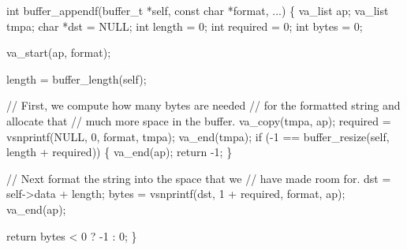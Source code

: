 \documentclass[
  a4paper,
]{scrreprt}
\newenvironment{Shaded}{\begin{snugshade}}{\end{snugshade}}
\newcommand{\CommentTok}[1]{\textcolor[rgb]{0.41,0.41,0.41}{#1}}
\newcommand{\ControlFlowTok}[1]{\textcolor[rgb]{0.85,0.12,0.09}{#1}}
\newcommand{\DataTypeTok}[1]{\textcolor[rgb]{0.47,0.16,0.63}{#1}}
\newcommand{\DecValTok}[1]{\textcolor[rgb]{0.47,0.16,0.63}{#1}}
\newcommand{\NormalTok}[1]{\textcolor[rgb]{0.33,0.33,0.33}{#1}}
\newcommand{\OperatorTok}[1]{\textcolor[rgb]{0.00,0.46,0.62}{#1}}
\theoremstyle{definition}
\theoremstyle{remark}
\begin{document}
\begin{Shaded}
\begin{Highlighting}[numbers=left,,]
\DataTypeTok{int}\NormalTok{ buffer\_appendf}\OperatorTok{(}\NormalTok{buffer\_t }\OperatorTok{*}\NormalTok{self}\OperatorTok{,} \DataTypeTok{const} \DataTypeTok{char} \OperatorTok{*}\NormalTok{format}\OperatorTok{,} \OperatorTok{...)} \OperatorTok{\{}
  \DataTypeTok{va\_list}\NormalTok{ ap}\OperatorTok{;}
  \DataTypeTok{va\_list}\NormalTok{ tmpa}\OperatorTok{;}
  \DataTypeTok{char} \OperatorTok{*}\NormalTok{dst }\OperatorTok{=}\NormalTok{ NULL}\OperatorTok{;}
  \DataTypeTok{int}\NormalTok{ length }\OperatorTok{=} \DecValTok{0}\OperatorTok{;}
  \DataTypeTok{int}\NormalTok{ required }\OperatorTok{=} \DecValTok{0}\OperatorTok{;}
  \DataTypeTok{int}\NormalTok{ bytes }\OperatorTok{=} \DecValTok{0}\OperatorTok{;}

\NormalTok{  va\_start}\OperatorTok{(}\NormalTok{ap}\OperatorTok{,}\NormalTok{ format}\OperatorTok{);}

\NormalTok{  length }\OperatorTok{=}\NormalTok{ buffer\_length}\OperatorTok{(}\NormalTok{self}\OperatorTok{);}

  \CommentTok{// First, we compute how many bytes are needed}
  \CommentTok{// for the formatted string and allocate that}
  \CommentTok{// much more space in the buffer.}
\NormalTok{  va\_copy}\OperatorTok{(}\NormalTok{tmpa}\OperatorTok{,}\NormalTok{ ap}\OperatorTok{);}
\NormalTok{  required }\OperatorTok{=}\NormalTok{ vsnprintf}\OperatorTok{(}\NormalTok{NULL}\OperatorTok{,} \DecValTok{0}\OperatorTok{,}\NormalTok{ format}\OperatorTok{,}\NormalTok{ tmpa}\OperatorTok{);}
\NormalTok{  va\_end}\OperatorTok{(}\NormalTok{tmpa}\OperatorTok{);}
  \ControlFlowTok{if} \OperatorTok{({-}}\DecValTok{1} \OperatorTok{==}\NormalTok{ buffer\_resize}\OperatorTok{(}\NormalTok{self}\OperatorTok{,}\NormalTok{ length }\OperatorTok{+}\NormalTok{ required}\OperatorTok{))} \OperatorTok{\{}
\NormalTok{    va\_end}\OperatorTok{(}\NormalTok{ap}\OperatorTok{);}
    \ControlFlowTok{return} \OperatorTok{{-}}\DecValTok{1}\OperatorTok{;}
  \OperatorTok{\}}

  \CommentTok{// Next format the string into the space that we}
  \CommentTok{// have made room for.}
\NormalTok{  dst }\OperatorTok{=}\NormalTok{ self}\OperatorTok{{-}\textgreater{}}\NormalTok{data }\OperatorTok{+}\NormalTok{ length}\OperatorTok{;}
\NormalTok{  bytes }\OperatorTok{=}\NormalTok{ vsnprintf}\OperatorTok{(}\NormalTok{dst}\OperatorTok{,} \DecValTok{1} \OperatorTok{+}\NormalTok{ required}\OperatorTok{,}\NormalTok{ format}\OperatorTok{,}\NormalTok{ ap}\OperatorTok{);}
\NormalTok{  va\_end}\OperatorTok{(}\NormalTok{ap}\OperatorTok{);}

  \ControlFlowTok{return}\NormalTok{ bytes }\OperatorTok{\textless{}} \DecValTok{0}
    \OperatorTok{?} \OperatorTok{{-}}\DecValTok{1}
    \OperatorTok{:} \DecValTok{0}\OperatorTok{;}
\OperatorTok{\}}
\end{Highlighting}
\end{Shaded}
\end{document}
